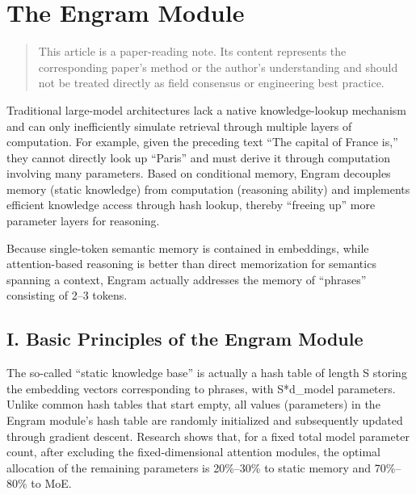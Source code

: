 \setcounter{section}{1}

\hypertarget{the-engram-module}{%
\section{The Engram Module}\label{the-engram-module}}

\begin{quote}
This article is a paper-reading note. Its content represents the corresponding paper's method or the author's understanding and should not be treated directly as field consensus or engineering best practice.
\end{quote}

Traditional large-model architectures lack a native knowledge-lookup mechanism and can only inefficiently simulate retrieval through multiple layers of computation. For example, given the preceding text ``The capital of France is,'' they cannot directly look up ``Paris'' and must derive it through computation involving many parameters. Based on conditional memory, Engram decouples memory (static knowledge) from computation (reasoning ability) and implements efficient knowledge access through hash lookup, thereby ``freeing up'' more parameter layers for reasoning.

Because single-token semantic memory is contained in embeddings, while attention-based reasoning is better than direct memorization for semantics spanning a context, Engram actually addresses the memory of ``phrases'' consisting of 2--3 tokens.

\hypertarget{i.-basic-principles-of-the-engram-module}{%
\subsection{I. Basic Principles of the Engram Module}\label{i.-basic-principles-of-the-engram-module}}

The so-called ``static knowledge base'' is actually a hash table of length S storing the embedding vectors corresponding to phrases, with S*d\_model parameters. Unlike common hash tables that start empty, all values (parameters) in the Engram module's hash table are randomly initialized and subsequently updated through gradient descent. Research shows that, for a fixed total model parameter count, after excluding the fixed-dimensional attention modules, the optimal allocation of the remaining parameters is 20\%--30\% to static memory and 70\%--80\% to MoE.

